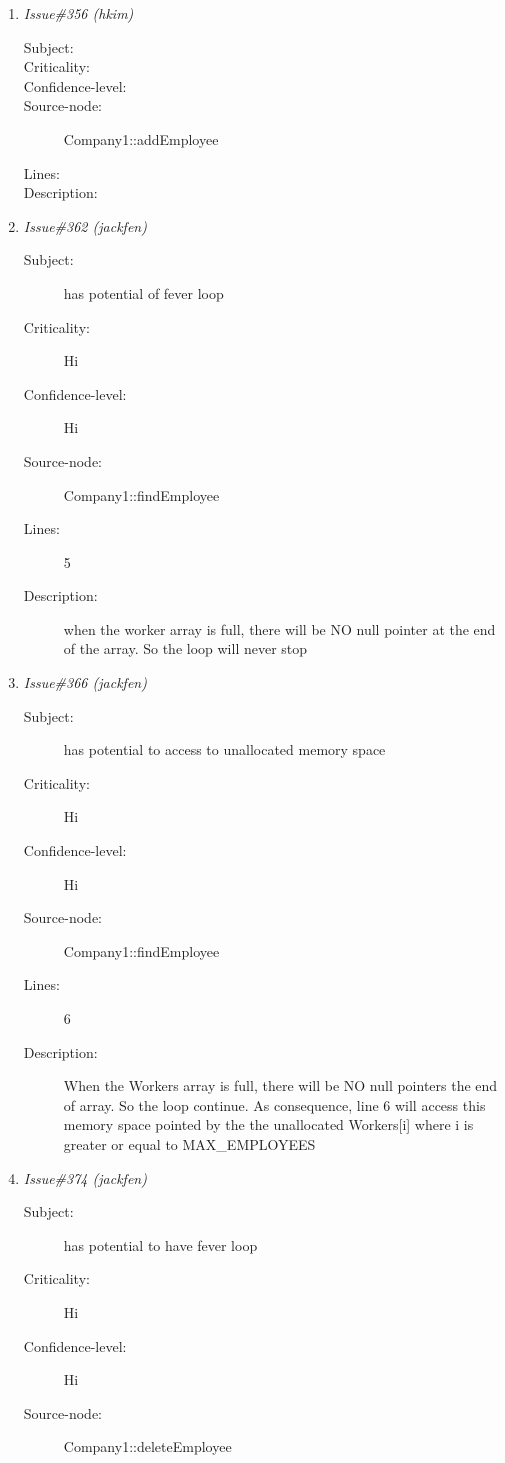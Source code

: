 \begin{enumerate}
\begin{description}
\item [Lines:] 30-31

\item [Description:] try the case if currentSSN == newSSN.  It will
stop the loop the allow insertion on the lines followed
\end{description}
\item {\it Issue\#356 (hkim)}
\begin{description}
\item [Subject:] 
\item [Criticality:] 
\item [Confidence-level:] 
\item [Source-node:] Company1::addEmployee

\item [Lines:] 

\item [Description:] 
\end{description}
\item {\it Issue\#362 (jackfen)}
\begin{description}
\item [Subject:] has potential of fever loop
\item [Criticality:] Hi
\item [Confidence-level:] Hi
\item [Source-node:] Company1::findEmployee

\item [Lines:] 5

\item [Description:] when the worker array is full, there will be
NO null pointer at the end of the array.  So the loop will never stop
\end{description}
\item {\it Issue\#366 (jackfen)}
\begin{description}
\item [Subject:] has potential to access to unallocated memory space
\item [Criticality:] Hi
\item [Confidence-level:] Hi
\item [Source-node:] Company1::findEmployee

\item [Lines:] 6

\item [Description:] When the Workers array is full, there will be
NO null pointers the end of array.  So the loop continue.  As consequence, line 6 will
access this memory space pointed by the the unallocated Workers[i] where i is greater
or equal to MAX\_EMPLOYEES
\end{description}
\item {\it Issue\#374 (jackfen)}
\begin{description}
\item [Subject:] has potential to have fever loop
\item [Criticality:] Hi
\item [Confidence-level:] Hi
\item [Source-node:] Company1::deleteEmployee


\end{description}
\end{enumerate}
